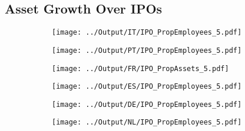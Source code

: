 \documentclass[12pt,notitlepage]{article}
\begin{document}
\subsection{Asset Growth Over IPOs}
\FloatBarrier
\begin{figure}[!htpb]
\centering
\begin{subfigure}{.49\textwidth}
    \centering
 \texttt{[image: ../Output/IT/IPO\_PropEmployees\_5.pdf]}
\end{subfigure}%
\begin{subfigure}{.49\textwidth}
    \centering
 \texttt{[image: ../Output/PT/IPO\_PropEmployees\_5.pdf]}
\end{subfigure}
\begin{subfigure}{.49\textwidth}
    \centering
 \texttt{[image: ../Output/FR/IPO\_PropAssets\_5.pdf]}
\end{subfigure}%
\begin{subfigure}{.49\textwidth}
    \centering
 \texttt{[image: ../Output/ES/IPO\_PropEmployees\_5.pdf]}
\end{subfigure}
\begin{subfigure}{.49\textwidth}
    \centering
 \texttt{[image: ../Output/DE/IPO\_PropEmployees\_5.pdf]}
\end{subfigure}
\begin{subfigure}{.49\textwidth}
    \centering
 \texttt{[image: ../Output/NL/IPO\_PropEmployees\_5.pdf]}
\end{subfigure}
\end{figure}



\FloatBarrier
\end{document}

